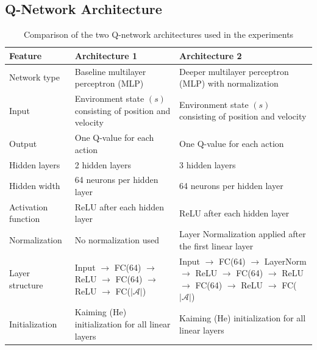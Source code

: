 \documentclass[11pt,a4paper]{article}
\begin{document}
\begin{appendices}



\section{Q-Network Architecture}
\begin{table}[H]
\centering
\caption{Comparison of the two Q-network architectures used in the experiments}
\label{tab:arch_comparison}
\renewcommand{\arraystretch}{1.25}
\begin{tabular}{p{3.2cm} p{5.3cm} p{5.3cm}}
\toprule
\textbf{Feature} & \textbf{Architecture 1} & \textbf{Architecture 2} \\
\midrule

Network type &
Baseline multilayer perceptron (MLP) &
Deeper multilayer perceptron (MLP) with normalization \\

Input &
Environment state $(s)$ consisting of position and velocity &
Environment state $(s)$ consisting of position and velocity \\

Output &
One Q-value for each action &
One Q-value for each action \\

Hidden layers &
2 hidden layers &
3 hidden layers \\

Hidden width &
64 neurons per hidden layer &
64 neurons per hidden layer \\

Activation function &
ReLU after each hidden layer &
ReLU after each hidden layer \\

Normalization &
No normalization used &
Layer Normalization applied after the first linear layer \\

Layer structure &
Input $\rightarrow$ FC(64) $\rightarrow$ ReLU $\rightarrow$ FC(64) $\rightarrow$ ReLU $\rightarrow$ FC($|\mathcal{A}|$) &
Input $\rightarrow$ FC(64) $\rightarrow$ LayerNorm $\rightarrow$ ReLU $\rightarrow$ FC(64) $\rightarrow$ ReLU $\rightarrow$ FC(64) $\rightarrow$ ReLU $\rightarrow$ FC($|\mathcal{A}|$) \\

Initialization &
Kaiming (He) initialization for all linear layers &
Kaiming (He) initialization for all linear layers \\


\end{tabular}
\end{table}
\end{appendices}
\end{document}
